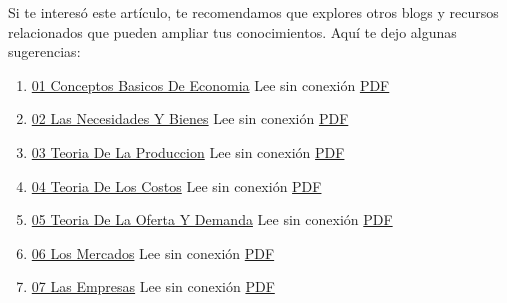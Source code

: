 \documentclass[
  jou,
  floatsintext,
  longtable,
  a4paper,
  nolmodern,
  notxfonts,
  notimes,
  colorlinks=true,linkcolor=blue,citecolor=blue,urlcolor=blue]{apa7}
\providecommand{\tightlist}{%
  \setlength{\itemsep}{0pt}\setlength{\parskip}{0pt}}
\begin{document}
Si te interesó este artículo, te recomendamos que explores otros blogs y
recursos relacionados que pueden ampliar tus conocimientos. Aquí te dejo
algunas sugerencias:

\begin{enumerate}
\def\labelenumi{\arabic{enumi}.}
\tightlist
\item
  \href{https://achalmaedison.netlify.app/teching/economia-preuniversitaria/2014-01-01-01-conceptos-basicos-de-economia}{01
  Conceptos Basicos De Economia} Lee sin conexión
  \href{https://achalmaedison.netlify.app/teching/economia-preuniversitaria/2014-01-01-01-conceptos-basicos-de-economia/index.pdf}{PDF}
\item
  \href{https://achalmaedison.netlify.app/teching/economia-preuniversitaria/2014-01-07-02-las-necesidades-y-bienes}{02
  Las Necesidades Y Bienes} Lee sin conexión
  \href{https://achalmaedison.netlify.app/teching/economia-preuniversitaria/2014-01-07-02-las-necesidades-y-bienes/index.pdf}{PDF}
\item
  \href{https://achalmaedison.netlify.app/teching/economia-preuniversitaria/2014-01-14-03-teoria-de-la-produccion}{03
  Teoria De La Produccion} Lee sin conexión
  \href{https://achalmaedison.netlify.app/teching/economia-preuniversitaria/2014-01-14-03-teoria-de-la-produccion/index.pdf}{PDF}
\item
  \href{https://achalmaedison.netlify.app/teching/economia-preuniversitaria/2014-01-21-04-teoria-de-los-costos}{04
  Teoria De Los Costos} Lee sin conexión
  \href{https://achalmaedison.netlify.app/teching/economia-preuniversitaria/2014-01-21-04-teoria-de-los-costos/index.pdf}{PDF}
\item
  \href{https://achalmaedison.netlify.app/teching/economia-preuniversitaria/2014-01-28-05-teoria-de-la-oferta-y-demanda}{05
  Teoria De La Oferta Y Demanda} Lee sin conexión
  \href{https://achalmaedison.netlify.app/teching/economia-preuniversitaria/2014-01-28-05-teoria-de-la-oferta-y-demanda/index.pdf}{PDF}
\item
  \href{https://achalmaedison.netlify.app/teching/economia-preuniversitaria/2014-02-04-06-los-mercados}{06
  Los Mercados} Lee sin conexión
  \href{https://achalmaedison.netlify.app/teching/economia-preuniversitaria/2014-02-04-06-los-mercados/index.pdf}{PDF}
\item
  \href{https://achalmaedison.netlify.app/teching/economia-preuniversitaria/2014-02-11-07-las-empresas}{07
  Las Empresas} Lee sin conexión
  \href{https://achalmaedison.netlify.app/teching/economia-preuniversitaria/2014-02-11-07-las-empresas/index.pdf}{PDF}

\end{enumerate}
\end{document}
